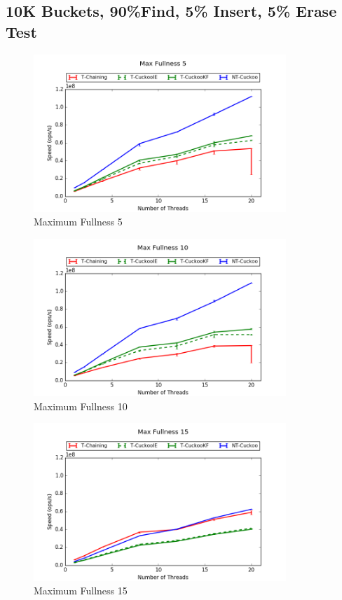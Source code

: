 \subsection{10K Buckets, 90\%Find, 5\% Insert, 5\% Erase Test}
\begin{figure}[H]
    \centering
	\includegraphics[width=0.85\textwidth]{maps/5HM10K:F90,I5,E5.png} 
        \caption*{Maximum Fullness 5}
    \end{figure}
\begin{figure}[H]
    \centering
	\includegraphics[width=0.85\textwidth]{maps/10HM10K:F90,I5,E5.png} 
        \caption*{Maximum Fullness 10}
    \end{figure}
\begin{figure}[H]
    \centering
	\includegraphics[width=0.85\textwidth]{maps/15HM1M:F90,I5,E5.png} 
        \caption*{Maximum Fullness 15}
    \end{figure}

